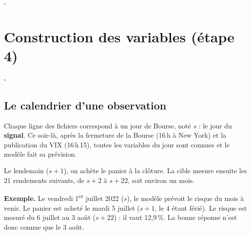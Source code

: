 \documentclass[10pt,a4paper]{article}
\makeatletter
\newcommand{\besoin}[1]{\par\penalty-100\begingroup\setlength{\dimen@}{#1}%
  \dimen@ii\pagegoal\advance\dimen@ii-\pagetotal
  \ifdim\dimen@>\dimen@ii\ifdim\dimen@ii>\z@\vfil\fi\break\fi\endgroup}
\let\sectionorigine\section
\renewcommand{\section}{\besoin{6\baselineskip}\sectionorigine}
\let\soussectionorigine\subsection
\renewcommand{\subsection}{\besoin{5\baselineskip}\soussectionorigine}
\makeatother
\begin{document}
\section{Construction des variables (étape 4)}\label{sec:variables}
\subsection{Le calendrier d'une observation}
Chaque ligne des fichiers correspond à un jour de Bourse, noté $s$ : le jour du \textbf{signal}. Ce soir-là, après la fermeture de la Bourse (16\,h à New York) et la publication du VIX (16\,h\,15), toutes les variables du jour sont connues et le modèle fait sa prévision.

\begin{center}
\end{center}
Le lendemain ($s+1$), on achète le panier à la clôture. La cible mesure ensuite les 21 rendements suivants, de $s+2$ à $s+22$, soit environ un mois.

\textbf{Exemple.} Le vendredi 1\textsuperscript{er} juillet 2022 ($s$), le modèle prévoit le risque du mois à venir. Le panier est acheté le mardi 5 juillet ($s+1$, le 4 étant férié). Le risque est mesuré du 6 juillet au 3 août ($s+22$) : il vaut 12,9\,\%. La bonne réponse n'est donc connue que le 3 août.
\end{document}
